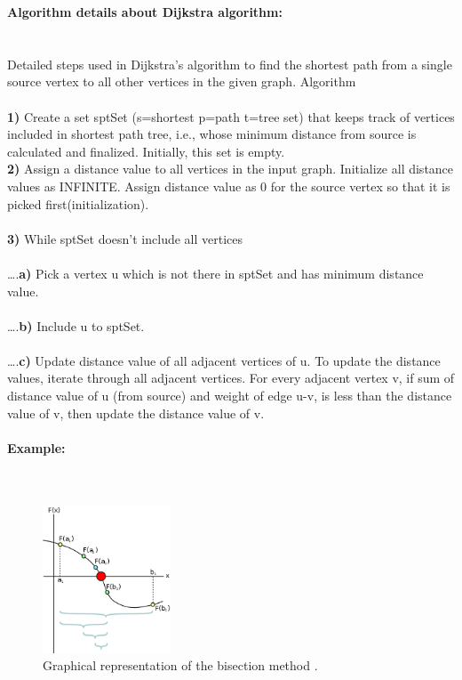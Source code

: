 \documentclass[a4paper,10pt]{article}
\begin{document}
\begin{multicols}{2}
\textbf{\large Algorithm details about Dijkstra algorithm:}\\\\\\
Detailed steps used in Dijkstra’s algorithm to find the shortest path from a single source vertex to all other vertices in the given graph.
Algorithm\\\\
\textbf{1)} Create a set sptSet (s=shortest p=path t=tree set) that keeps track of vertices included in shortest path tree, i.e., whose minimum distance from source is calculated and finalized. Initially, this set is empty.\\
\textbf{2)} Assign a distance value to all vertices in the input graph. Initialize all distance values as INFINITE. Assign distance value as 0 for the source vertex so that it is picked first(initialization).\\\\
\textbf{3)} While sptSet doesn’t include all vertices\\\\
….\textbf{a)} Pick a vertex u which is not there in sptSet and has minimum distance value.\\\\
….\textbf{b)} Include u to sptSet.\\\\
….\textbf{c)} Update distance value of all adjacent vertices of u. To update the distance values, iterate through all adjacent vertices. For every adjacent vertex v, if sum of distance value of u (from source) and weight of edge u-v, is less than the distance value of v, then update the distance value of v.\\\\

\textbf{\large Example:}\\\\\\
\begin{figure}[h]
 \centering
  \includegraphics[width=1.5in]{bisect.png}
    \caption{Graphical representation of the bisection method \cite{r5}.}
  \label{fig:bisect1}
  \end{figure}

\end{multicols}
\end{document}
